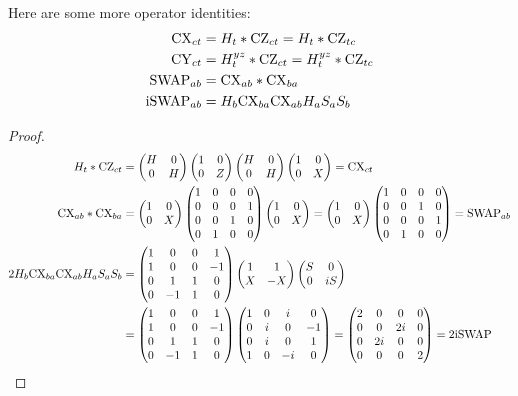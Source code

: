 \documentclass[a4paper,english]{scrartcl}
\begin{document}
\begin{proposition}\label{.more_identities}
Here are some more operator identities:
\begin{align}
  \cx_{ct} &= H_t * \cz_{ct} = H_t * \cz_{tc}\\
  \cy_{ct} &= H^{yz}_t * \cz_{ct} = H^{yz}_t * \cz_{tc}\\
  \Swap_{ab} &= \cx_{ab} * \cx_{ba}\\
  \iSwap_{ab} &= H_b \cx_{ba} \cx_{ab} H_a S_a S_b
\end{align}
\end{proposition}
\begin{proof}
\begin{align}
  H_t * \cz_{ct} &= \matp{H&0\\0&H} \matp{1&0\\0&Z} \matp{H&0\\0&H} \matp{1&0\\0&X} =
  \cx_{ct}\\
  \cx_{ab} * \cx_{ba}&= \matp{1&0\\0&X} \matp{1&0&0&0\\0&0&0&1\\0&0&1&0\\0&1&0&0}
  \matp{1&0\\0&X} = \matp{1&0\\0&X} \matp{1&0&0&0\\0&0&1&0\\0&0&0&1\\0&1&0&0} =
  \Swap_{ab}\\
  2H_b\cx_{ba}\cx_{ab}H_aS_aS_b &=
  \matp{1&0&0&1\\1&0&0&-1\\0&1&1&0\\0&-1&1&0} \matp{1&1\\X&-X} \matp{S&0\\0&iS}\\
  &= \matp{1&0&0&1\\1&0&0&-1\\0&1&1&0\\0&-1&1&0}
  \matp{1&0&i&0\\0&i&0&-1\\0&i&0&1\\1&0&-i&0} = \matp{2&0&0&0\\0&0&2i&0\\0&2i&0&0\\0&0&0&2} = 2 \iSwap
\end{align}
\end{proof}

\printbibliography
\end{document}

